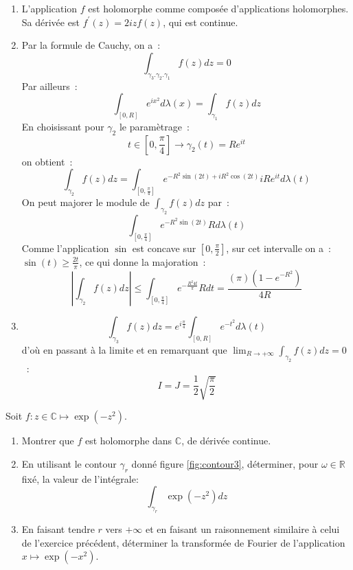 \documentclass[a4paper, 12pt]{amsart}
\begin{document}
\begin{enumerate}
\item L'application $f$ est holomorphe comme composée d'applications
holomorphes. Sa dérivée est $f^\prime(z) = 2 i z f(z)$, qui est continue. 
\item
Par la formule de Cauchy, on a~:
\[
\int_{\gamma_3 . \gamma_2 . \gamma_1} f(z) dz = 0
\]
Par ailleurs~:
\[
\int_{[0,R]} e^{ix^2}d \lambda(x) = \int_{\gamma_1} f(z) dz
\]
En choisissant pour $\gamma_2$ le paramètrage~:
\[
t \in [0, \frac{\pi}{4}] \to \gamma_2(t) = R e^{it}
\]
on obtient~:
\[
\int_{\gamma_2} f(z) dz = \int_{[0, \frac{\pi}{4}]} e^{-R^2 \sin (2t)
+ i R^2 \cos(2t)} i R e^{it} d \lambda(t)
\]
On peut majorer le module de $\int_{\gamma_2} f(z) dz$ par~:
\[
\int_{[0, \frac{\pi}{4}]} e^{-R^2 \sin (2t)}  R d \lambda(t)
\]
Comme l'application $\sin$ est concave sur $[0, \frac{\pi}{2}]$, sur
cet intervalle on a~: $\sin(t) \geq \frac{2 t}{\pi}$, ce qui donne la
majoration~:
\[
\left | \int_{\gamma_2} f(z) dz \right | \leq 
\int_{[0, \frac{\pi}{4}]} e^{-\frac{R^2 4 t}{\pi}} R dt =
\frac{(\pi)(1- e^{-R^2})}{4 R}
\]
\item
\[
\int_{\gamma_3} f(z) dz = e^{i \frac{\pi}{4}} \int_{[0,R]} e^{-t^2} d\lambda(t)
\]
d'où en passant à la limite et en remarquant que $\lim_{R \to
+\infty}\int_{\gamma_2} f(z) dz = 0$~:
\[
I = J = \frac{1}{2} \sqrt{\frac{\pi}{2}}
\]
\end{enumerate}
\begin{fex}
 Soit $f \colon z \in \mathbb{C} \mapsto \exp(-z^2)$.
\begin{enumerate}
  \item Montrer que $f$ est holomorphe dans $\mathbb{C}$, de dérivée continue.
  \item En utilisant le contour $\gamma_r$ donné figure \ref{fig:contour3},
déterminer, pour
  $\omega \in \mathbb{R}$ fixé, la valeur de l'intégrale:
  \[
  \int_{\gamma_r} \exp(-z^2)dz
  \]
  \item En faisant tendre $r$ vers $+\infty$ et en faisant un raisonnement
  similaire à celui de l'exercice précédent, déterminer la transformée de
  Fourier de l'application $x \mapsto \exp(-x^2)$.
\end{enumerate}
\end{fex}
\end{document}
